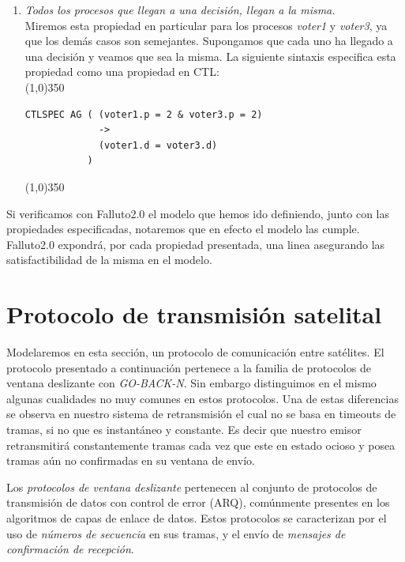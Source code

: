 \documentclass[titlepage, 12pt]{book}
\begin{document}
\begin{enumerate}
\item \textit{Todos los procesos que llegan a una decisi\'on, llegan a la misma.}\\ Miremos esta propiedad en particular para los procesos \textit{voter1} y \textit{voter3}, ya que los dem\'as casos son semejantes. Supongamos que cada uno ha llegado a una decisi\'on y veamos que sea la misma. La siguiente sintaxis especifica esta propiedad como una propiedad en CTL:\\
\noindent \line(1,0){350}
\begin{verbatim}
CTLSPEC AG ( (voter1.p = 2 & voter3.p = 2) 
             -> 
             (voter1.d = voter3.d)
           )
\end{verbatim}
\noindent \line(1,0){350}

\end{enumerate}

Si verificamos con Falluto2.0 el modelo que hemos ido definiendo, junto con las propiedades especificadas, notaremos que en efecto el modelo las cumple. Falluto2.0 expondr\'a, por cada propiedad presentada, una linea asegurando las satisfactibilidad de la misma en el modelo.






\section{Protocolo de transmisi\'on satelital}

Modelaremos en esta secci\'on, un protocolo de comunicaci\'on entre sat\'elites. El protocolo presentado a continuaci\'on pertenece a la familia de protocolos de ventana deslizante con \textit{GO-BACK-N}. Sin embargo distinguimos en el mismo algunas cualidades no muy comunes en estos protocolos. Una de estas diferencias se observa en nuestro sistema de retransmisi\'on el cual no se basa en timeouts de tramas, si no que es instant\'aneo y constante. Es decir que nuestro emisor retransmitir\'a constantemente tramas cada vez que este en estado ocioso y posea tramas a\'un no confirmadas en su ventana de env\'io.

Los \textit{protocolos de ventana deslizante} pertenecen al conjunto de protocolos de transmisi\'on de datos con control de error (ARQ), com\'unmente presentes en los algoritmos de capas de enlace de datos. Estos protocolos se caracterizan por el uso de \textit{n\'umeros de secuencia} en sus tramas, y el env\'io de \textit{mensajes de confirmaci\'on de recepci\'on}.
\end{document}
